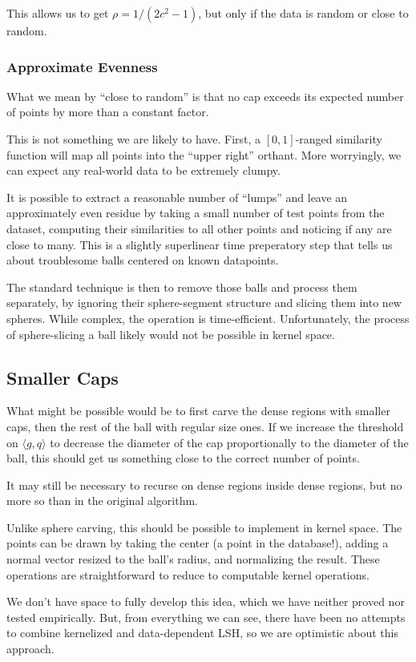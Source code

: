 \documentclass[twoside,11pt]{homework}
\begin{document}
\begin{multicols}{2}
This allows us to get $\rho=1/(2c^2-1)$, but only if the data is
random or close to random.

\subsubsection{Approximate Evenness}

What we mean by ``close to random'' is that no cap exceeds its
expected number of points by more than a constant factor.

This is not something we are likely to have.  First, a $[0,1]$-ranged
similarity function will map all points into the ``upper right''
orthant.  More worryingly, we can expect any real-world data to be
extremely clumpy.

It is possible to extract a reasonable number of ``lumps'' and leave
an approximately even residue by taking a small number of test points
from the dataset, computing their similarities to all other points and
noticing if any are close to many.  This is a slightly superlinear
time preperatory step that tells us about troublesome balls centered
on known datapoints.

The standard technique is then to remove those balls and process them
separately, by ignoring their sphere-segment structure and slicing
them into new spheres.  While complex, the operation is
time-efficient.  Unfortunately, the process of sphere-slicing a ball
likely would not be possible in kernel space.

\subsection{Smaller Caps}

What might be possible would be to first carve the dense regions with
smaller caps, then the rest of the ball with regular size ones.  If we
increase the threshold on $\langle g,q \rangle$ to decrease the
diameter of the cap proportionally to the diameter of the ball, this
should get us something close to the correct number of points.  

It may still be necessary to recurse on dense regions inside dense
regions, but no more so than in the original algorithm.

Unlike sphere carving, this should be possible to implement in kernel
space.  The points can be drawn by taking the center (a point in the
database!), adding a normal vector resized to the ball's radius, and
normalizing the result.  These operations are straightforward to
reduce to computable kernel operations.

We don't have space to fully develop this idea, which we have neither
proved nor tested empirically.  But, from everything we can see, there
have been no attempts to combine kernelized and data-dependent LSH, so
we are optimistic about this approach.

\end{multicols}
\newpage
\end{document}
